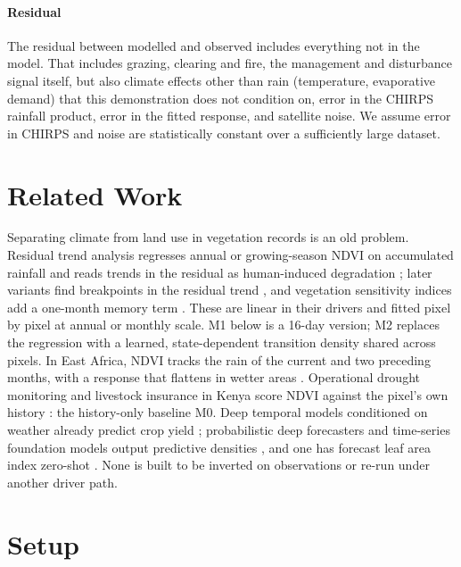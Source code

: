 \documentclass[letterpaper]{article} %
\begin{document}
\paragraph{Residual} The residual between modelled and observed includes everything not in the model. That includes grazing, clearing and fire, the management and disturbance signal itself, but also climate effects other than rain (temperature, evaporative demand) that this demonstration does not condition on, error in the CHIRPS rainfall product, error in the fitted response, and satellite noise. We assume error in CHIRPS and noise are statistically constant over a sufficiently large dataset.

\section{Related Work}
Separating climate from land use in vegetation records is an old problem. Residual trend analysis regresses annual or growing-season NDVI on accumulated rainfall and reads trends in the residual as human-induced degradation \citep{evans2004,wessels2007}; later variants find breakpoints in the residual trend \citep{burrell2017}, and vegetation sensitivity indices add a one-month memory term \citep{seddon2016}. These are linear in their drivers and fitted pixel by pixel at annual or monthly scale. M1 below is a 16-day version; M2 replaces the regression with a learned, state-dependent transition density shared across pixels. In East Africa, NDVI tracks the rain of the current and two preceding months, with a response that flattens in wetter areas \citep{nicholson1990,davenport1993}. Operational drought monitoring and livestock insurance in Kenya score NDVI against the pixel's own history \citep{kogan1990,klisch2016,vrieling2014,ibli}: the history-only baseline M0. Deep temporal models conditioned on weather already predict crop yield \citep{shook2021}; probabilistic deep forecasters and time-series foundation models output predictive densities \citep{salinas2020,rasul2023,ansari2024}, and one has forecast leaf area index zero-shot \citep{zhang2025}. None is built to be inverted on observations or re-run under another driver path.

\section{Setup}
\end{document}
